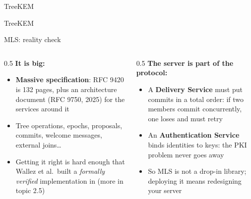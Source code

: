 \ifdefined\PRESENTATION\else\PassOptionsToClass{handout}{beamer}\fi\documentclass[aspectratio=169, lualatex]{beamer}
\begin{document}
\begin{frame}{TreeKEM}
	\vspace{-0.4cm}
\end{frame}

\begin{frame}{TreeKEM}
	\vspace{-0.4cm}
\end{frame}

\begin{frame}{MLS: reality check}
	\begin{columns}[c]
		\begin{column}{0.5\textwidth}
			\textbf{It is big:}
			\begin{itemize}
				\item \textbf{Massive specification}: RFC 9420 is 132 pages, plus an architecture document (RFC 9750, 2025) for the services around it
				\item Tree operations, epochs, proposals, commits, welcome messages, external joins\ldots
				\item Getting it right is hard enough that Wallez et al.\ built a \textit{formally verified} implementation in \fstar (more in topic 2.5)
			\end{itemize}
		\end{column}
		\begin{column}{0.5\textwidth}
			\textbf{The server is part of the protocol:}
			\begin{itemize}
				\item A \textbf{Delivery Service} must put commits in a total order: if two members commit concurrently, one loses and must retry
				\item An \textbf{Authentication Service} binds identities to keys: the PKI problem never goes away
				\item So MLS is not a drop-in library; deploying it means redesigning your server
			\end{itemize}
		\end{column}
	\end{columns}
\end{frame}
\end{document}
